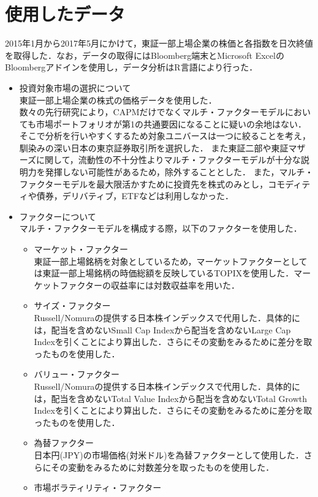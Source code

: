 ﻿\documentclass[11pt]{jreport}
\begin{document}
\section{使用したデータ}
2015年1月から2017年5月にかけて，東証一部上場企業の株価と各指数を日次終値を取得した．なお，データの取得にはBloomberg端末とMicrosoft ExcelのBloombergアドインを使用し，データ分析はR言語により行った．
\begin{itemize}
\item 投資対象市場の選択について\\
\quad 東証一部上場企業の株式の価格データを使用した．\\
\quad 数々の先行研究により，CAPMだけでなくマルチ・ファクターモデルにおいても市場ポートフォリオが第1の共通要因になることに疑いの余地はない．
そこで分析を行いやすくするため対象ユニバースは一つに絞ることを考え，馴染みの深い日本の東京証券取引所を選択した．
また東証二部や東証マザーズに関して，流動性の不十分性よりマルチ・ファクターモデルが十分な説明力を発揮しない可能性があるため，除外することとした．
また，マルチ・ファクターモデルを最大限活かすために投資先を株式のみとし，コモディティや債券，デリバティブ，ETFなどは利用しなかった．
\item ファクターについて\\
マルチ・ファクターモデルを構成する際，以下のファクターを使用した．
\begin{itemize}
\item マーケット・ファクター\\
東証一部上場銘柄を対象としているため，マーケットファクターとしては東証一部上場銘柄の時価総額を反映しているTOPIXを使用した．マーケットファクターの収益率には対数収益率を用いた．
\item サイズ・ファクター\\
Russell/Nomuraの提供する日本株インデックスで代用した．具体的には，配当を含めないSmall Cap Indexから配当を含めないLarge Cap Indexを引くことにより算出した．さらにその変動をみるために差分を取ったものを使用した．
\item バリュー・ファクター\\
Russell/Nomuraの提供する日本株インデックスで代用した．具体的には，配当を含めないTotal Value Indexから配当を含めないTotal Growth Indexを引くことにより算出した．さらにその変動をみるために差分を取ったものを使用した．
\item 為替ファクター\\
日本円(JPY)の市場価格(対米ドル)を為替ファクターとして使用した．さらにその変動をみるために対数差分を取ったものを使用した．
\item 市場ボラティリティ・ファクター\\

\end{itemize}
\end{itemize}
\end{document}
